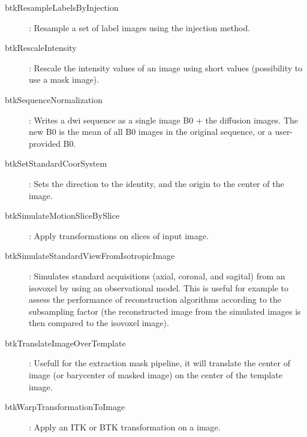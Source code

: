 \begin{description}
\item[btkResampleLabelsByInjection]: Resample a set of label images using the injection method.
\item[btkRescaleIntensity]: Rescale the intensity values of an image using short values (possibility to use a mask image).
\item[btkSequenceNormalization]: Writes a dwi sequence as a single image B0 + the diffusion images. The new B0 is the mean of all B0 images in the original sequence, or a user-provided B0.
\item[btkSetStandardCoorSystem]: Sets the direction to the identity, and the origin to the center of the image.
\item[btkSimulateMotionSliceBySlice]: Apply transformations on slices of input image.
\item[btkSimulateStandardViewFromIsotropicImage]: Simulates standard acquisitions (axial, coronal, and sagital) from an isovoxel by using an observational model. This is useful for example to assess the performance of reconstruction algorithms according to the subsampling factor (the reconstructed image from the simulated images is then compared to the isovoxel image). 
\item[btkTranslateImageOverTemplate]: Usefull for the extraction mask pipeline, it will translate the center of image (or barycenter of masked image) on the center of the template image.
\item[btkWarpTransformationToImage]: Apply an ITK or BTK transformation on a image.

\end{description}
